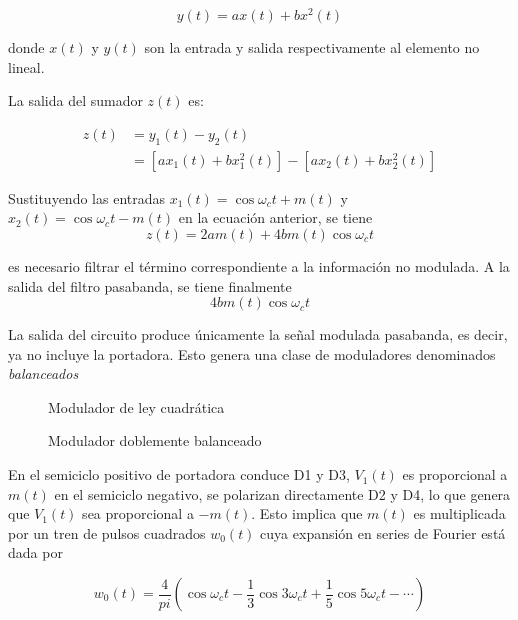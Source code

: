 \documentclass[12pt,letterpaper,titlepage,twoside]{book}
\begin{document}
\begin{equation}
y(t) = ax(t) + bx^2(t)
\end{equation}

donde $x(t)$ y $y(t)$ son la entrada y salida respectivamente al elemento no lineal.

La salida del sumador $z(t)$ es: 

\begin{align}
z(t) &= y_1(t) - y_2(t)\\ \nonumber
&= \left[ ax_1(t)+ bx^2_1(t) \right] - \left[ ax_2(t)+ bx^2_2(t) \right] 
\end{align}

Sustituyendo las entradas $x_1(t)=\cos \omega_c t + m(t)$ y $x_2(t)=\cos \omega_c t - m(t)$ en la ecuación anterior, se tiene
\begin{equation}
z(t) = 2 a m(t) + 4 b m(t) \cos \omega_c t 
\end{equation}

es necesario filtrar el término correspondiente a la información no modulada. A la salida del filtro pasabanda, se tiene finalmente 
\begin{equation}
4bm(t)\cos \omega_ct
\end{equation}

La salida del circuito produce únicamente la señal modulada pasabanda, es decir, ya no incluye la portadora. Esto genera una clase de moduladores denominados \emph{balanceados}
\begin{figure}

\caption{Modulador de ley cuadrática}
\end{figure} \label{fig:modlc}



\begin{figure}

\caption{Modulador doblemente balanceado} \label{fig:moddouble}
\end{figure}

En el semiciclo positivo de portadora  conduce D1 y D3, $V_1(t)$ es proporcional a $m(t)$ en el semiciclo negativo, se polarizan directamente D2 y D4, lo que genera que $V_1(t)$ sea proporcional a $-m(t)$. Esto implica que $m(t)$ es multiplicada por un tren de pulsos cuadrados $w_0(t)$ cuya expansión en series de Fourier está dada por 

\begin{equation}
w_0(t) = \frac{4}{pi} \left( \cos \omega_ct - \frac{1}{3} \cos 3\omega_ct +\frac{1}{5} \cos 5\omega_ct - \cdots \right) 
\end{equation}
\end{document}
